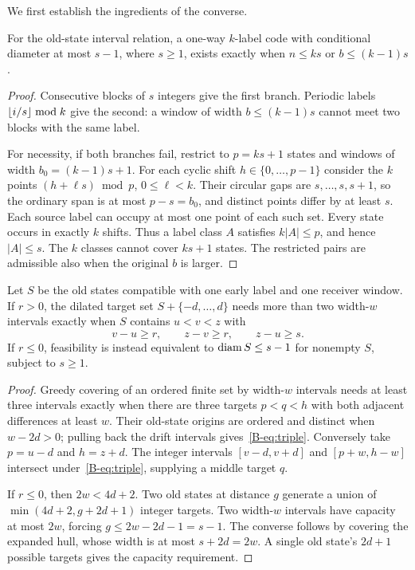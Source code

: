 We first establish the ingredients of the converse.
\begin{lemma}\label{B-lem:oneway}
For the old-state interval relation, a one-way $k$-label code with conditional diameter at most $s-1$, where $s\geq1$, exists exactly when $n\leq ks$ or $b\leq(k-1)s$.
\end{lemma}
\begin{proof}
Consecutive blocks of $s$ integers give the first branch. Periodic labels $\left\lfloor i/s\right\rfloor\bmod k$ give the second: a window of width $b\leq(k-1)s$ cannot meet two blocks with the same label.

For necessity, if both branches fail, restrict to $p=ks+1$ states and windows of width $b_0=(k-1)s+1$. For each cyclic shift $h\in\{0,\ldots,p-1\}$ consider the $k$ points $(h+\ell s)\bmod p$, $0\leq\ell<k$. Their circular gaps are $s,\ldots,s,s+1$, so the ordinary span is at most $p-s=b_0$, and distinct points differ by at least $s$. Each source label can occupy at most one point of each such set. Every state occurs in exactly $k$ shifts. Thus a label class $A$ satisfies $k|A|\leq p$, and hence $|A|\leq s$. The $k$ classes cannot cover $ks+1$ states. The restricted pairs are admissible also when the original $b$ is larger.
\end{proof}

\begin{lemma}\label{B-lem:local}
Let $S$ be the old states compatible with one early label and one receiver window. If $r>0$, the dilated target set $S+\{-d,\ldots,d\}$ needs more than two width-$w$ intervals exactly when $S$ contains $u<v<z$ with
\begin{equation}\label{B-eq:triple}
v-u\geq r,\qquad z-v\geq r,\qquad z-u\geq s.
\end{equation}
If $r\leq0$, feasibility is instead equivalent to $\operatorname{diam} S\leq s-1$ for nonempty $S$, subject to $s\geq1$.
\end{lemma}
\begin{proof}
Greedy covering of an ordered finite set by width-$w$ intervals needs at least three intervals exactly when there are three targets $p<q<h$ with both adjacent differences at least $w$. Their old-state origins are ordered and distinct when $w-2d>0$; pulling back the drift intervals gives~\eqref{B-eq:triple}. Conversely take $p=u-d$ and $h=z+d$. The integer intervals $[v-d,v+d]$ and $[p+w,h-w]$ intersect under~\eqref{B-eq:triple}, supplying a middle target $q$.

If $r\leq0$, then $2w<4d+2$. Two old states at distance $g$ generate a union of $\min(4d+2,g+2d+1)$ integer targets. Two width-$w$ intervals have capacity at most $2w$, forcing $g\leq2w-2d-1=s-1$. The converse follows by covering the expanded hull, whose width is at most $s+2d=2w$. A single old state's $2d+1$ possible targets gives the capacity requirement.
\end{proof}

